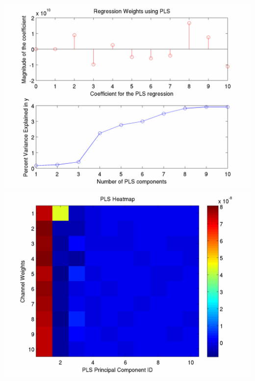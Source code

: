 \documentclass[12pt]{article}
\begin{document}
\includegraphics[scale=0.2]{pls_regression_weights_pctvar.png}
\includegraphics[scale=0.2]{PLS_heatmap.png}
\end{document}
